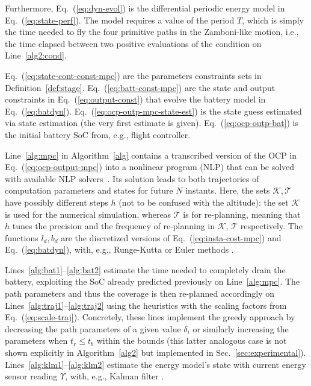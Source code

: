 \documentclass[letterpaper,10pt,journal,twoside]{IEEEtran}
\theoremstyle{definition}
\begin{document}
Furthermore, Eq.~(\ref{eq:dyn-evol}) is the differential periodic energy model in Eq.~(\ref{eq:state-perf}). The model requires a value of the period $T$, which is simply the time needed to fly the four primitive paths in the Zamboni-like motion, i.e., the time elapsed between two positive evaluations of the condition on Line~\ref{alg2:cond}.

Eq.~(\ref{eq:state-cont-const-mpc}) are the parameters constraints sets in Definition~\ref{def:stage}. Eq.~(\ref{eq:batt-const-mpc}) are the state and output constraints in Eq.~(\ref{eq:output-const}) that evolve the battery model in Eq.~(\ref{eq:batdyn}). Eq.~(\ref{eq:ocp-outp-mpc-state-est}) is the state guess estimated via state estimation %
(the very first estimate is given). Eq.~(\ref{eq:ocp-outp-bat}) is the initial battery SoC from, e.g., flight controller.

Line~\ref{alg:mpc} in Algorithm~\ref{alg} contains a transcribed version of the OCP in Eq.~(\ref{eq:ocp-output-mpc}) into a nonlinear program (NLP) that can be %
solved with available NLP solvers~\cite{rawlings2017model}. Its solution leads to both trajectories of {\color{blue} computation} parameters and states for future $N$ instants. Here, the sets $\mathcal{K},\mathcal{T}$ have possibly different steps $h$ (not to be confused with the altitude){\color{blue}: 
the set $\mathcal{K}$ is used for the numerical simulation, whereas $\mathcal{T}$ is for re-planning, meaning that $h$ tunes the precision and the frequency of re-planning in $\mathcal{K}$, $\mathcal{T}$ respectively.}
The functions $l_d,b_d$ are the discretized versions of Eq.~(\ref{eq:insta-cost-mpc}) and Eq.~(\ref{eq:batdyn}), with, e.g., Runge-Kutta or Euler methods%
.

Lines~\ref{alg:bat1}--\ref{alg:bat2} estimate the time needed to completely drain the battery, exploiting the SoC already predicted previously on Line~\ref{alg:mpc}. The {\color{blue}path parameters and thus the} coverage is then re{\color{blue}-}planned accordingly on Lines~\ref{alg:traj1}--\ref{alg:traj2} using {\color{blue} the heuristics with the} %
scaling factors from Eq.~(\ref{eq:scale-traj}). 
{\color{blue} Concretely, these lines implement the greedy approach by decreasing the path parameters of a given value $\delta_i$ or similarly increasing the parameters when $t_r\leq t_b$ within the bounds (this latter analogous case is not shown explicitly in Algorithm~\ref{alg2} but implemented in Sec.~\ref{sec:experimental})}.
Lines~\ref{alg:klm1}--\ref{alg:klm2} estimate the energy model's state with current energy sensor reading $\Upsilon$, with, e.g., %
Kalman filter%
.
\end{document}
